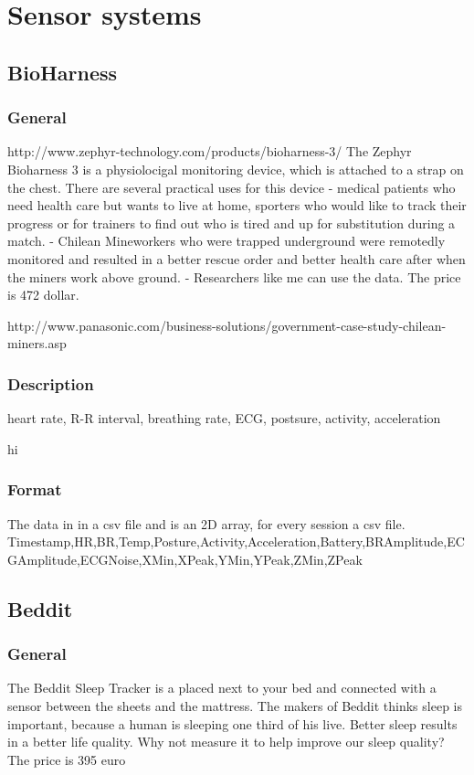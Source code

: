 \section{Sensor systems}
	\subsection{BioHarness}
		\subsubsection{General}
			http://www.zephyr-technology.com/products/bioharness-3/	
			The Zephyr Bioharness 3 \cite{bioharness} is a physiolocigal monitoring device, which is attached to a strap on the chest. There are several practical uses for this device - medical patients who need health care but wants to live at home, sporters who would like to track their progress or for trainers to find out who is tired and up for substitution during a match.
			- Chilean Mineworkers who were trapped underground were remotedly monitored and resulted in a better rescue order and better health care after when the miners work above ground.
			- Researchers like me can use the data.
			The price is 472 dollar.
		
	http://www.panasonic.com/business-solutions/government-case-study-chilean-miners.asp	
		\subsubsection{Description}
			heart rate, R-R interval, breathing rate, ECG, postsure, activity, acceleration

			hi
		\subsubsection{Format}
		The data in in a csv file and is an 2D array, for every session a csv file.
		Timestamp,HR,BR,Temp,Posture,Activity,Acceleration,Battery,BRAmplitude,ECGAmplitude,ECGNoise,XMin,XPeak,YMin,YPeak,ZMin,ZPeak
	\subsection{Beddit}
		\subsubsection{General}
			The Beddit Sleep Tracker is a placed next to your bed and connected with a sensor between the sheets and the mattress. The makers of Beddit thinks sleep is important, because a human is sleeping one third of his live. Better sleep results in a better life quality. Why not measure it to help improve our sleep quality? 
			The price is 395 euro

